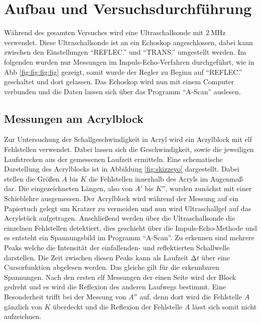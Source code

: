 \section{Aufbau und Versuchsdurchführung}

Während des gesamten Versuches wird eine Ultraschallsonde mit $\SI{2}{\mega\hertz}$ verwendet. Diese Ultraschallsonde ist an ein Echoskop angeschlossen, dabei kann zwischen den Einstellungen
\enquote{REFLEC.} und \enquote{TRANS.} umgestellt werden. Im folgenden wurden nur Messungen im Impuls-Echo-Verfahren durchgeführt, wie in Abb \ref{fig:fig:fig:fig} gezeigt, somit wurde der Regler zu Beginn auf \enquote{REFLEC.}
geschaltet und dort gelassen. Das Echoskop wird nun mit einem Computer verbunden und die Daten lassen sich über das Programm \enquote{A-Scan} auslesen.

\subsection{Messungen am Acrylblock}

Zur Untersuchung der Schallgeschwindigkeit in Acryl wird ein Acrylblock mit elf Fehlstellen verwendet. Dabei lassen sich die Geschwindigkeit, sowie die jeweiligen Laufstrecken aus der gemessenen Laufzeit ermitteln. Eine schematische Darstellung 
des Acrylblocks ist in Abbildung \ref{fig:skizzeyo} dargestellt. Dabei stellen die Größen $A$ bis $K$ die Fehlstellen innerhalb des Acryls im Augenmaß dar. Die eingezeichneten Längen, also von $A'$ bis $K''$, wurden zunächst mit einer Schieblehre ausgemessen. Der Acrylblock wird während der Messung auf ein Papiertuch gelegt um Kratzer zu vermeiden und 
nun wird Ultraschallgel auf das Acrylstück aufgetragen. Anschließend werden über die Ultraschallsonde die einzelnen Fehlstellen detektiert, dies geschieht über die Impuls-Echo-Methode und es entsteht ein Spannungsbild im Programm \enquote{A-Scan}. Zu erkennen sind mehrere Peaks welche die Intensität der einfallenden- und reflektierten Schallwelle darstellen.
Die Zeit zwischen diesen Peaks kann als Laufzeit $\increment t$ über eine Cursorfunktion abgelesen werden. Das gleiche gilt für die erkennbaren Spannungen. Nach den ersten elf Messungen der einen Seite wird der Block gedreht und es wird die 
Reflexion des anderen Laufwegs bestimmt. Eine Besonderheit trifft bei der Messung von $A''$ auf, denn dort wird die Fehlstelle $A$ gänzlich von $K$ überdeckt und die Reflexion der Fehlstelle $A$ lässt sich somit nicht aufzeichnen.

